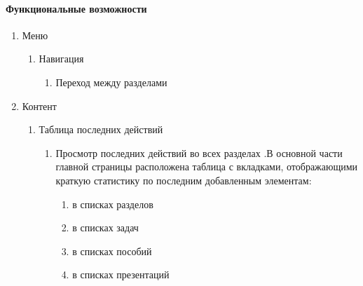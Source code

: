 \paragraph{Функциональные возможности}
\begin{enumerate}
  \item Меню
  \begin{enumerate}
    \item Навигация
    \begin{enumerate}
      \item Переход между разделами
    \end{enumerate}
  \end{enumerate}

  \item Контент
  \begin{enumerate}
    \item Таблица последних действий
    \begin{enumerate}
      \item Просмотр последних действий во всех разделах .В основной части главной страницы расположена таблица с вкладками, отображающими краткую статистику по последним добавленным элементам:
      \begin{enumerate}
        \item  в списках разделов
        \item  в списках задач
        \item  в списках пособий
        \item  в списках презентаций
      \end{enumerate}
    \end{enumerate}
  \end{enumerate}
\end{enumerate}
